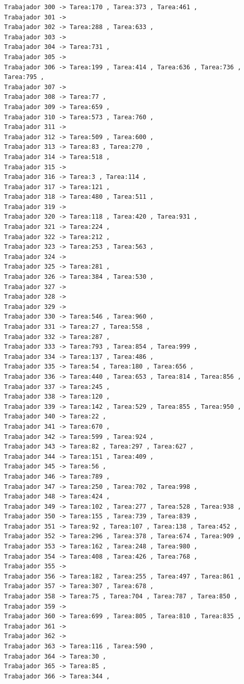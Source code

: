 \documentclass{article}
\begin{document}
\begin{lstlisting}
Trabajador 300 -> Tarea:170 , Tarea:373 , Tarea:461 , 
Trabajador 301 -> 
Trabajador 302 -> Tarea:288 , Tarea:633 , 
Trabajador 303 -> 
Trabajador 304 -> Tarea:731 , 
Trabajador 305 -> 
Trabajador 306 -> Tarea:199 , Tarea:414 , Tarea:636 , Tarea:736 , Tarea:795 , 
Trabajador 307 -> 
Trabajador 308 -> Tarea:77 , 
Trabajador 309 -> Tarea:659 , 
Trabajador 310 -> Tarea:573 , Tarea:760 , 
Trabajador 311 -> 
Trabajador 312 -> Tarea:509 , Tarea:600 , 
Trabajador 313 -> Tarea:83 , Tarea:270 , 
Trabajador 314 -> Tarea:518 , 
Trabajador 315 -> 
Trabajador 316 -> Tarea:3 , Tarea:114 , 
Trabajador 317 -> Tarea:121 , 
Trabajador 318 -> Tarea:480 , Tarea:511 , 
Trabajador 319 -> 
Trabajador 320 -> Tarea:118 , Tarea:420 , Tarea:931 , 
Trabajador 321 -> Tarea:224 , 
Trabajador 322 -> Tarea:212 , 
Trabajador 323 -> Tarea:253 , Tarea:563 , 
Trabajador 324 -> 
Trabajador 325 -> Tarea:281 , 
Trabajador 326 -> Tarea:384 , Tarea:530 , 
Trabajador 327 -> 
Trabajador 328 -> 
Trabajador 329 -> 
Trabajador 330 -> Tarea:546 , Tarea:960 , 
Trabajador 331 -> Tarea:27 , Tarea:558 , 
Trabajador 332 -> Tarea:287 , 
Trabajador 333 -> Tarea:793 , Tarea:854 , Tarea:999 , 
Trabajador 334 -> Tarea:137 , Tarea:486 , 
Trabajador 335 -> Tarea:54 , Tarea:180 , Tarea:656 , 
Trabajador 336 -> Tarea:440 , Tarea:653 , Tarea:814 , Tarea:856 , 
Trabajador 337 -> Tarea:245 , 
Trabajador 338 -> Tarea:120 , 
Trabajador 339 -> Tarea:142 , Tarea:529 , Tarea:855 , Tarea:950 , 
Trabajador 340 -> Tarea:22 , 
Trabajador 341 -> Tarea:670 , 
Trabajador 342 -> Tarea:599 , Tarea:924 , 
Trabajador 343 -> Tarea:82 , Tarea:297 , Tarea:627 , 
Trabajador 344 -> Tarea:151 , Tarea:409 , 
Trabajador 345 -> Tarea:56 , 
Trabajador 346 -> Tarea:789 , 
Trabajador 347 -> Tarea:250 , Tarea:702 , Tarea:998 , 
Trabajador 348 -> Tarea:424 , 
Trabajador 349 -> Tarea:102 , Tarea:277 , Tarea:528 , Tarea:938 , 
Trabajador 350 -> Tarea:155 , Tarea:739 , Tarea:839 , 
Trabajador 351 -> Tarea:92 , Tarea:107 , Tarea:138 , Tarea:452 , 
Trabajador 352 -> Tarea:296 , Tarea:378 , Tarea:674 , Tarea:909 , 
Trabajador 353 -> Tarea:162 , Tarea:248 , Tarea:980 , 
Trabajador 354 -> Tarea:408 , Tarea:426 , Tarea:768 , 
Trabajador 355 -> 
Trabajador 356 -> Tarea:182 , Tarea:255 , Tarea:497 , Tarea:861 , 
Trabajador 357 -> Tarea:307 , Tarea:678 , 
Trabajador 358 -> Tarea:75 , Tarea:704 , Tarea:787 , Tarea:850 , 
Trabajador 359 -> 
Trabajador 360 -> Tarea:699 , Tarea:805 , Tarea:810 , Tarea:835 , 
Trabajador 361 -> 
Trabajador 362 -> 
Trabajador 363 -> Tarea:116 , Tarea:590 , 
Trabajador 364 -> Tarea:30 , 
Trabajador 365 -> Tarea:85 , 
Trabajador 366 -> Tarea:344 , 

\end{lstlisting}
\end{document}
